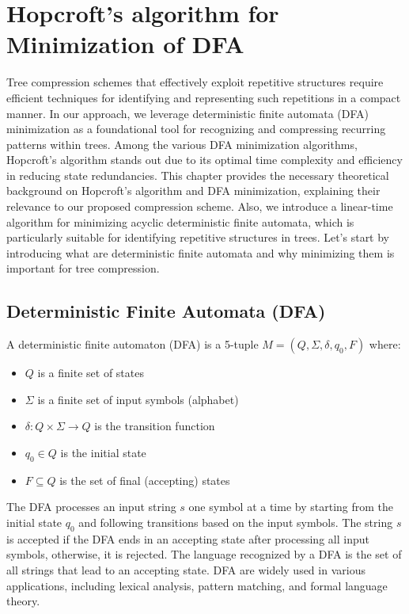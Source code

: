 \chapter{Hopcroft's algorithm for Minimization of DFA} \label{chp:hopcroft}
Tree compression schemes that effectively exploit repetitive structures require efficient techniques for identifying and representing such repetitions in a compact manner. In our approach, we leverage deterministic finite automata (DFA) minimization as a foundational tool for recognizing and compressing recurring patterns within trees. Among the various DFA minimization algorithms, Hopcroft's algorithm stands out due to its optimal time complexity and efficiency in reducing state redundancies. This chapter provides the necessary theoretical background on Hopcroft's algorithm and DFA minimization, explaining their relevance to our proposed compression scheme. Also, we introduce a linear-time algorithm for minimizing acyclic deterministic finite automata, which is particularly suitable for identifying repetitive structures in trees. Let's start by introducing what are deterministic finite automata and why minimizing them is important for tree compression.

\section{Deterministic Finite Automata (DFA)}
\begin{definition} \label{def:dfa}
    A deterministic finite automaton (DFA) is a 5-tuple $M = (Q, \Sigma, \delta, q_0, F)$ where:
    \begin{itemize}
        \item $Q$ is a finite set of states
        \item $\Sigma$ is a finite set of input symbols (alphabet)
        \item $\delta: Q \times \Sigma \rightarrow Q$ is the transition function
        \item $q_0 \in Q$ is the initial state
        \item $F \subseteq Q$ is the set of final (accepting) states
    \end{itemize}
\end{definition}

The DFA processes an input string $s$ one symbol at a time by starting from the initial state $q_0$ and following transitions based on the input symbols. The string $s$ is accepted if the DFA ends in an accepting state after processing all input symbols, otherwise, it is rejected. The language recognized by a DFA is the set of all strings that lead to an accepting state. DFA are widely used in various applications, including lexical analysis, pattern matching, and formal language theory. 

